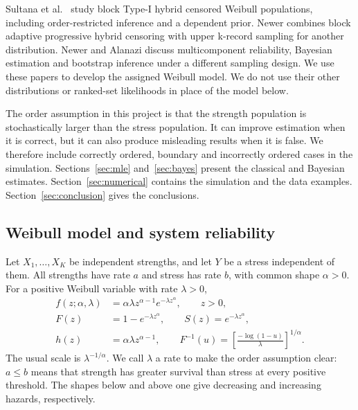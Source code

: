 \documentclass[a4paper,11pt]{article}
\begin{document}
Sultana et al.\ \cite{Sultana2026} study block Type-I hybrid censored Weibull populations, including order-restricted inference and a dependent prior. Newer \cite{Newer2025} combines block adaptive progressive hybrid censoring with upper k-record sampling for another distribution. Newer and Alanazi \cite{NewerAlanazi2026} discuss multicomponent reliability, Bayesian estimation and bootstrap inference under a different sampling design. We use these papers to develop the assigned Weibull model. We do not use their other distributions or ranked-set likelihoods in place of the model below.

The order assumption in this project is that the strength population is stochastically larger than the stress population. It can improve estimation when it is correct, but it can also produce misleading results when it is false. We therefore include correctly ordered, boundary and incorrectly ordered cases in the simulation. Sections~\ref{sec:mle} and~\ref{sec:bayes} present the classical and Bayesian estimates. Section~\ref{sec:numerical} contains the simulation and the data examples. Section~\ref{sec:conclusion} gives the conclusions.

\subsection{Weibull model and system reliability}\label{sec:model}
Let $X_1,\ldots,X_K$ be independent strengths, and let $Y$ be a stress independent of them. All strengths have rate $a$ and stress has rate $b$, with common shape $\alpha>0$. For a positive Weibull variable with rate $\lambda>0$,
\begin{align}
f(z;\alpha,\lambda)&=\alpha\lambda z^{\alpha-1}e^{-\lambda z^\alpha},\qquad z>0,\label{eq:density}\\
F(z)&=1-e^{-\lambda z^\alpha},\qquad S(z)=e^{-\lambda z^\alpha},\label{eq:survival}\\
h(z)&=\alpha\lambda z^{\alpha-1},\qquad
F^{-1}(u)=\left[\frac{-\log(1-u)}{\lambda}\right]^{1/\alpha}.\label{eq:quantile}
\end{align}
The usual scale is $\lambda^{-1/\alpha}$. We call $\lambda$ a rate to make the order assumption clear: $a\le b$ means that strength has greater survival than stress at every positive threshold. The shapes below and above one give decreasing and increasing hazards, respectively.
\end{document}
